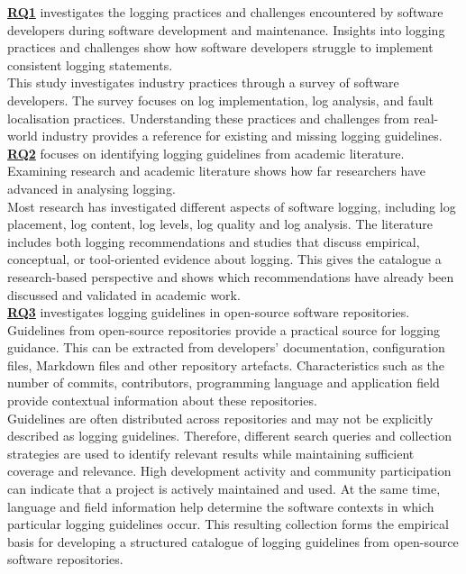 \hyperref[table:t1rq]{\textbf{RQ1}} investigates the logging practices and challenges encountered by software developers during software development and maintenance.
Insights into logging practices and challenges show how software developers struggle to implement consistent logging statements.
\\
This study investigates industry practices through a survey of software developers. The survey focuses on log implementation, log analysis, and 
fault localisation practices.
Understanding these practices and challenges from real-world industry provides a reference for existing and missing logging guidelines.
\\

\hyperref[table:t1rq]{\textbf{RQ2}} focuses on identifying logging guidelines from academic literature.
Examining research and academic literature shows how far researchers have advanced in analysing logging.
\\
Most research has investigated different aspects of software logging, including log placement, log content, log levels, log quality and log analysis.
The literature includes both logging recommendations and studies that discuss empirical, conceptual, or tool-oriented evidence about logging.
This gives the catalogue a research-based perspective and shows which recommendations have already been discussed and validated in academic work.
\\

\hyperref[table:t1rq]{\textbf{RQ3}} investigates logging guidelines in open-source software repositories.
Guidelines from open-source repositories provide a practical source for logging guidance. This can be extracted from
developers' documentation, configuration files, Markdown files and other repository artefacts. 
Characteristics such as the number of commits, contributors, programming language and application field provide contextual information about these repositories.
\\
Guidelines are often distributed across repositories and may not be explicitly described as logging guidelines.
Therefore, different search queries and collection strategies are used to identify relevant results while maintaining
sufficient coverage and relevance.
High development activity and community participation can indicate that a project is actively maintained and used.
At the same time, language and field information help determine the software contexts in which particular logging guidelines occur.
This resulting collection forms the empirical basis for developing a structured catalogue of logging guidelines from open-source software repositories.
\\

